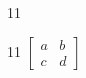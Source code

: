 \documentclass[paper=A4]{ropas-poster}
\begin{document}
\begin{postergrid}{1}{1}
\begin{posterblock}{1}{1}
$\begin{bmatrix}a&b\\c&d\end{bmatrix}$
\end{posterblock}
\end{postergrid}
\end{document}
